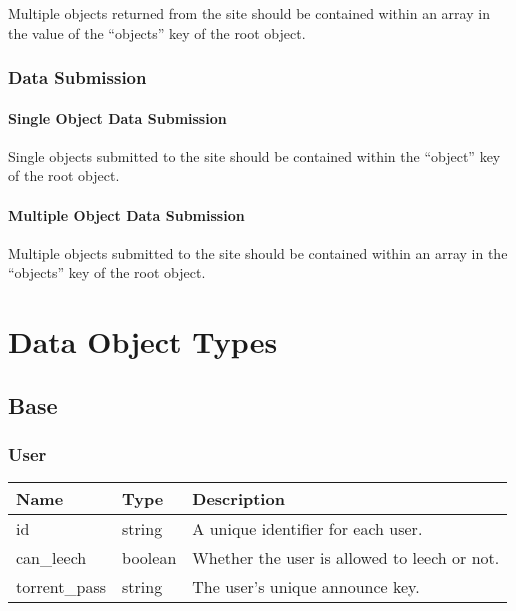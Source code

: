 \documentclass[10pt,letterpaper,titlepage]{report}
\begin{document}
Multiple objects returned from the site should be contained within an array in the value of the ``objects'' key of the root object.

\subsection{Data Submission}

\subsubsection{Single Object Data Submission}

Single objects submitted to the site should be contained within the ``object'' key of the root object.

\subsubsection{Multiple Object Data Submission}

Multiple objects submitted to the site should be contained within an array in the ``objects'' key of the root object.

\chapter{Data Object Types}

\section{Base}

\subsection{User}
\label{subsec:data:base:user}

\begin{center}
	\begin{tabular}{| p{2cm} | p{2cm} | p{7cm} |}
		\hline
	
		\textbf{Name} & \textbf{Type} & \textbf{Description} \\ \hline
		
		id & string & A unique identifier for each user. \\ \hline
		can\_leech & boolean & Whether the user is allowed to leech or not. \\ \hline
		torrent\_pass & string & The user's unique announce key. \\ \hline
	\end{tabular}
\end{center}
\end{document}
